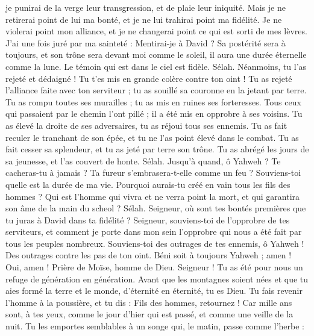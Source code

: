 \begin{multicols}{2}
je punirai de la verge leur transgression, et de plaie leur iniquité.
Mais je ne retirerai point de lui ma bonté, et je ne lui trahirai point ma fidélité.
Je ne violerai point mon alliance, et je ne changerai point ce qui est sorti de mes lèvres.
J'ai une fois juré par ma sainteté : Mentirai-je à David ?
Sa postérité sera à toujours, et son trône sera devant moi comme le soleil,
il aura une durée éternelle comme la lune. Le témoin qui est dans le ciel est fidèle. Sélah.
Néanmoins, tu l'as rejeté et dédaigné ! Tu t'es mis en grande colère contre ton oint !
Tu as rejeté l'alliance faite avec ton serviteur ; tu as souillé sa couronne en la jetant par terre.
Tu as rompu toutes ses murailles ; tu as mis en ruines ses forteresses.
Tous ceux qui passaient par le chemin l'ont pillé ; il a été mis en opprobre à ses voisins.
Tu as élevé la droite de ses adversaires, tu as réjoui tous ses ennemis.
Tu as fait reculer le tranchant de son épée, et tu ne l'as point élevé dans le combat.
Tu as fait cesser sa splendeur, et tu as jeté par terre son trône.
Tu as abrégé les jours de sa jeunesse, et l'as couvert de honte. Sélah.
Jusqu'à quand, ô Yahweh ? Te cacheras-tu à jamais ? Ta fureur s'embrasera-t-elle comme un feu ?
Souviens-toi quelle est la durée de ma vie. Pourquoi aurais-tu créé en vain tous les fils des hommes ?
Qui est l'homme qui vivra et ne verra point la mort, et qui garantira son âme de la main du scheol ? Sélah.
Seigneur, où sont tes bontés premières que tu juras à David dans ta fidélité ?
Seigneur, souviens-toi de l'opprobre de tes serviteurs, et comment je porte dans mon sein l'opprobre qui nous a été fait par tous les peuples nombreux.
Souviens-toi des outrages de tes ennemis, ô Yahweh ! Des outrages contre les pas de ton oint.
Béni soit à toujours Yahweh ; amen ! Oui, amen !
\VerseOne{}Prière de Moïse, homme de Dieu. Seigneur ! Tu as été pour nous un refuge de génération en génération.
Avant que les montagnes soient nées et que tu aies formé la terre et le monde, d'éternité en éternité, tu es Dieu.
Tu fais revenir l'homme à la poussière, et tu dis : Fils des hommes, retournez !
Car mille ans sont, à tes yeux, comme le jour d'hier qui est passé, et comme une veille de la nuit.
Tu les emportes semblables à un songe qui, le matin, passe comme l'herbe :

\end{multicols}
